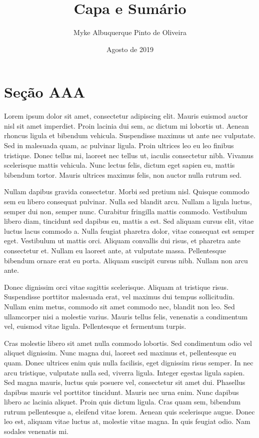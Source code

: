 \documentclass{article}
\begin{document}
	\title{\textbf{{\Huge Capa e Sumário}}}
	\author{Myke Albuquerque Pinto de Oliveira}
	\date{Agosto de 2019}
	
	\maketitle
	\thispagestyle{empty}
	\newpage
	
	\setcounter{page}{1}
	\tableofcontents
	\newpage
	
	\listoffigures
	\newpage
	
	\setcounter{page}{1}
	\section{Seção AAA}
	Lorem ipsum dolor sit amet, consectetur adipiscing elit. Mauris euismod auctor nisl sit amet imperdiet. Proin lacinia dui sem, ac dictum mi lobortis ut. Aenean rhoncus ligula et bibendum vehicula. Suspendisse maximus ut ante nec vulputate. Sed in malesuada quam, ac pulvinar ligula. Proin ultrices leo eu leo finibus tristique. Donec tellus mi, laoreet nec tellus ut, iaculis consectetur nibh. Vivamus scelerisque mattis vehicula. Nunc lectus felis, dictum eget sapien eu, mattis bibendum tortor. Mauris ultrices maximus felis, non auctor nulla rutrum sed.
	
	Nullam dapibus gravida consectetur. Morbi sed pretium nisl. Quisque commodo sem eu libero consequat pulvinar. Nulla sed blandit arcu. Nullam a ligula luctus, semper dui non, semper nunc. Curabitur fringilla mattis commodo. Vestibulum libero diam, tincidunt sed dapibus eu, mattis a est. Sed aliquam cursus elit, vitae luctus lacus commodo a. Nulla feugiat pharetra dolor, vitae consequat est semper eget. Vestibulum ut mattis orci. Aliquam convallis dui risus, et pharetra ante consectetur et. Nullam eu laoreet ante, at vulputate massa. Pellentesque bibendum ornare erat eu porta. Aliquam suscipit cursus nibh. Nullam non arcu ante.
	
	Donec dignissim orci vitae sagittis scelerisque. Aliquam at tristique risus. Suspendisse porttitor malesuada erat, vel maximus dui tempus sollicitudin. Nullam enim metus, commodo sit amet commodo nec, blandit non leo. Sed ullamcorper nisi a molestie varius. Mauris tellus felis, venenatis a condimentum vel, euismod vitae ligula. Pellentesque et fermentum turpis.
	
	Cras molestie libero sit amet nulla commodo lobortis. Sed condimentum odio vel aliquet dignissim. Nunc magna dui, laoreet sed maximus et, pellentesque eu quam. Donec ultrices enim quis nulla facilisis, eget dignissim risus semper. In nec arcu tristique, vulputate nulla sed, viverra ligula. Integer egestas ligula sapien. Sed magna mauris, luctus quis posuere vel, consectetur sit amet dui. Phasellus dapibus mauris vel porttitor tincidunt. Mauris nec urna enim. Nunc dapibus libero ac lacinia aliquet. Proin quis dictum ligula. Cras quam sem, bibendum rutrum pellentesque a, eleifend vitae lorem. Aenean quis scelerisque augue. Donec leo est, aliquam vitae luctus at, molestie vitae magna. In quis feugiat odio. Nam sodales venenatis mi.
	
\end{document}
